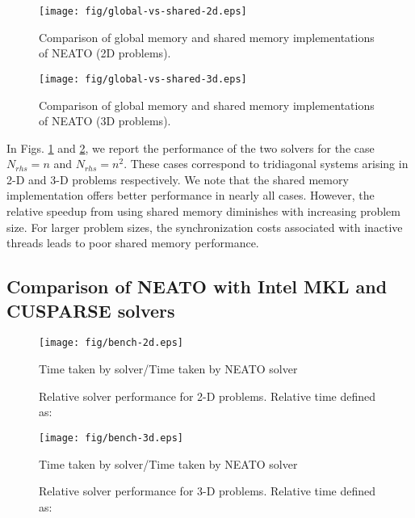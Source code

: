 \begin{figure}[h]
\begin{center}
\texttt{[image: fig/global-vs-shared-2d.eps]}
\caption{Comparison of global memory and shared
    memory implementations of NEATO (2D problems).}
\label{fig:global-vs-shared-2d}
\end{center}
\end{figure}

\begin{figure}[h]
\begin{center}
\texttt{[image: fig/global-vs-shared-3d.eps]}
\caption{Comparison of global memory and shared memory
    implementations of NEATO (3D problems).}
\label{fig:global-vs-shared-3d}
\end{center}
\end{figure}

In Figs. \ref{fig:global-vs-shared-2d} and \ref{fig:global-vs-shared-3d},
we report the performance of the two solvers for the case
$N_{rhs} = n$ and $N_{rhs} = n^2$.
These cases correspond to tridiagonal systems
arising in 2-D and 3-D problems respectively.
We note that the shared memory implementation
offers better performance in nearly all cases.
However, the relative speedup from using
shared memory diminishes with increasing problem size.
For larger problem sizes,
the synchronization costs associated with inactive threads
leads to poor shared memory performance.

\subsection{Comparison of NEATO with Intel MKL and CUSPARSE solvers}

\begin{figure}
\begin{center}
\texttt{[image: fig/bench-2d.eps]}
\caption{Relative solver performance for 2-D problems. Relative time defined as:}
Time taken by solver/Time taken by NEATO solver
\label{fig:bench-2d}
\end{center}
\end{figure}

\begin{figure}
\begin{center}
\texttt{[image: fig/bench-3d.eps]}
\caption{Relative solver performance for 3-D problems. Relative time defined as:}
Time taken by solver/Time taken by NEATO solver
\label{fig:bench-3d}
\end{center}
\end{figure}

